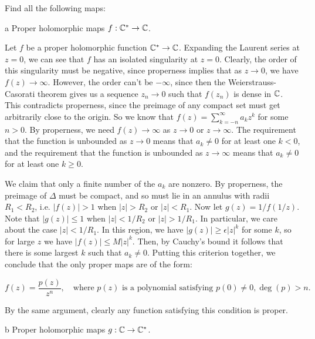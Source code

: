 \documentclass{pset}
\begin{document}
\begin{problem}{2.2}
  Find all the following maps:
\end{problem}

\begin{parts}
  \begin{part}{a}
    Proper holomorphic maps $f : \mathbb{C}^* \to \mathbb{C}$.
  \end{part}

  Let $f$ be a proper holomorphic function $\mathbb{C}^* \to \mathbb{C}$. Expanding the Laurent series at $z=0$, we can see that $f$ has an isolated singularity at $z=0$. Clearly, the order of this singularity must be negative, since properness implies that as $z\to 0$, we have $f(z) \to \infty$. However, the order can't be $-\infty$, since then the Weierstrauss-Casorati theorem gives us a sequence $z_n \to 0$ such that $f(z_n)$ is dense in $\mathbb{C}$. This contradicts properness, since the preimage of any compact set must get arbitrarily close to the origin. So we know that $f(z) = \sum_{k=-n}^\infty a_k z^k$ for some $n>0$. By properness, we need $f(z)\to \infty$ as $z\to 0$ or $z\to \infty$. The requirement that the function is unbounded as $z\to 0$ means that $a_k\neq 0$ for at least one $k<0$, and the requirement that the function is unbounded as $z\to \infty$ means that $a_k\neq 0$ for at least one $k\geq 0$. 

  We claim that only a finite number of the $a_k$ are nonzero. By properness, the preimage of $\Delta$ must be compact, and so must lie in an annulus with radii $R_1<R_2$, i.e. $|f(z)|>1$ when $|z|>R_2$ or $|z|<R_1$. Now let $g(z)=1/f(1/z)$. Note that $|g(z)|\leq 1$ when $|z|<1/R_2$ or $|z|>1/R_1$. In particular, we care about the case $|z|<1/R_1$. In this region, we have $|g(z)|\geq \epsilon|z|^k$ for some $k$, so for large $z$ we have $|f(z)|\leq M|z|^k$. Then, by Cauchy's bound it follows that there is some largest $k$ such that $a_k\neq 0$. Putting this criterion together, we conclude that the only proper maps are of the form:

  \[
  f(z) = \frac{p(z)}{z^n}, \quad \textrm{where }p(z)\textrm{ is a polynomial satisfying } p(0)\neq 0, \deg(p)>n.
  \]

  By the same argument, clearly any function satisfying this condition is proper.

  \begin{part}{b}
    Proper holomorphic maps $g : \mathbb{C} \to \mathbb{C}^*$.
  \end{part}


\end{parts}
\end{document}
